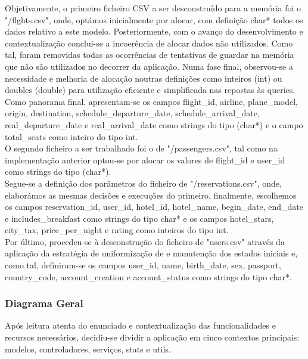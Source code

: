 \documentclass[12pt,a4paper]{article}
\begin{document}
    Objetivamente, o primeiro ficheiro CSV a ser desconstruído para a memória foi o "/flghts.csv", onde, optámos inicialmente por alocar, com definição char* todos os dados relativo a este modelo. Posteriormente, com o avanço do desenvolvimento e contextualização conclui-se a incoerência de alocar dados não utilizados. Como tal, foram removidas todas as ocorrências de tentativas de guardar na memória  que não são utilizados no decorrer da aplicação. Numa fase final, observou-se a necessidade e melhoria de alocação noutras definições como inteiros (int) ou doubles (double) para utilização eficiente e simplificada nas repostas às queries. Como panorama final, apresentam-se os campos flight\_id, airline, plane\_model, origin, destination, schedule\_departure\_date, schedule\_arrival\_date, real\_departure\_date e real\_arrival\_date como strings do tipo (char*) e o campo total\_seats como inteiro do tipo int.\\

    O segundo ficheiro a ser trabalhado foi o de "/passengers.csv", tal como na implementação anterior optou-se por alocar os valores de flight\_id e user\_id como strings do tipo (char*).\\

    Segue-se a definição dos parâmetros do ficheiro de "/reservations.csv", onde, elaborámos as mesmas decisões e execuções do primeiro, finalmente, escolhemos os campos reservation\_id, user\_id, hotel\_id, hotel\_name, begin\_date, end\_date e includes\_breakfast como strings do tipo char* e os campos hotel\_stars, city\_tax, price\_per\_night e rating como inteiros do tipo int.\\

    Por último, procedeu-se à desconstrução do ficheiro de "users.csv" através da aplicação da estratégia de uniformização de e manutenção dos estados iniciais e, como tal, definiram-se os campos user\_id, name, birth\_date, sex, passport, country\_code, account\_creation e account\_status como strings do tipo char*.\\
    
    \subsubsection{Diagrama Geral}
    \hspace{0,6cm}Após leitura atenta do enunciado e contextualização das funcionalidades e recursos necessários, decidiu-se dividir a aplicação em cinco contextos principais: modelos, controladores, serviços, stats e utils.\\
\end{document}
